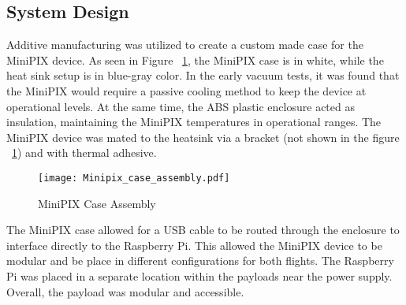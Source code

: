 \subsection{System Design}
Additive manufacturing was utilized to create a custom made case for the MiniPIX device.  As seen in Figure ~\ref{fig:minipix_case}, the MiniPIX case is in white, while the heat sink setup is in blue-gray color.  In the early vacuum tests, it was found that the MiniPIX would require a passive cooling method to keep the device at operational levels.  At the same time, the ABS plastic enclosure acted as insulation, maintaining the MiniPIX temperatures in operational ranges.  The MiniPIX device was mated to the heatsink via a bracket (not shown in the figure ~\ref{fig:minipix_case}) and with thermal adhesive.
\begin{figure}[H]
    \centering
    \texttt{[image: Minipix\_case\_assembly.pdf]}
    \caption{MiniPIX Case Assembly}
    \label{fig:minipix_case}
\end{figure}
The MiniPIX case allowed for a USB cable to be routed through the enclosure to interface directly to the Raspberry Pi.  This allowed the MiniPIX device to be modular and be place in different configurations for both flights.  The Raspberry Pi was placed in a separate location within the payloads near the power supply.  Overall, the payload was modular and accessible.



